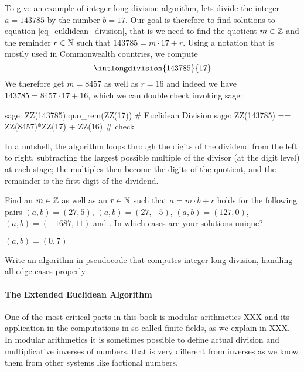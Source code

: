 \begin{example} To give an example of integer long division algorithm, lets divide the integer $a=143785$ by the number $b=17$. Our goal is therefore to find solutions to equation \ref{eq_euklidean_division}, that is we need to find the quotient $m\in\mathbb{Z}$ and the reminder $r \in \mathbb{N}$ such that $143785 = m\cdot 17 + r$. Using a notation that is mostly used in Commonwealth countries, we compute
\begin{equation}
\intlongdivision{143785}{17}
\end{equation}
We therefore get $m=8457$ as well as $r=16$ and indeed we have $143785 = 8457\cdot 17 + 16$, which we can double check invoking sage:
\begin{sagecommandline}
sage: ZZ(143785).quo_rem(ZZ(17)) # Euclidean Division
sage: ZZ(143785) == ZZ(8457)*ZZ(17) + ZZ(16) # check
\end{sagecommandline}
In a nutshell, the algorithm loops through the digits of the dividend from the left to right, subtracting the largest possible multiple of the divisor (at the digit level) at each stage; the multiples then become the digits of the quotient, and the remainder is the first digit of the dividend.
\end{example}
\begin{exercise}
Find an $m\in\mathbb{Z}$ as well as an $r\in\mathbb{N}$ such that $a= m\cdot b +r$ holds for the following pairs $(a,b) = (27,5)$, $(a,b)=(27,-5)$, $(a,b)=(127,0)$, $(a,b)= (-1687, 11)$ and . In which cases are your solutions unique?
\end{exercise}$(a,b)= (0, 7)$
\begin{exercise}
Write an algorithm in pseudocode that computes integer long division, handling all edge cases properly.
\end{exercise}

\paragraph{The Extended Euclidean Algorithm}
One of the most critical parts in this book is modular arithmetics XXX and its application in the computations in so called finite fields, as we explain in XXX. In modular arithmetics it is sometimes possible to define actual division and multiplicative inverses of numbers, that is very different from inverses as we know them from other systems like factional numbers. 


